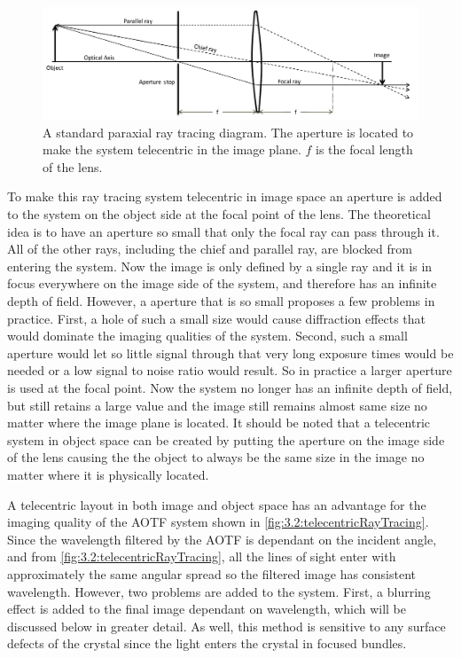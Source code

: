 \begin{figure}[h!]
    \includegraphics[width=1.0\textwidth]{./Images/3-2-RayTracing.pdf}
    \caption[Telecentric Ray Tracing Diagram]{A standard paraxial ray tracing diagram. The aperture is located to make the system telecentric in the image plane. $f$ is the focal length of the lens.}
    \label{fig:3.2:rayTracing}
\end{figure}

To make this ray tracing system telecentric in image space an aperture is added to the system on the object side at the focal point of the lens. The theoretical idea is to have an aperture so small that only the focal ray can pass through it. All of the other rays, including the chief and parallel ray, are blocked from entering the system. Now the image is only defined by a single ray and it is in focus everywhere on the image side of the system, and therefore has an infinite depth of field. However, a aperture that is so small proposes a few problems in practice. First, a hole of such a small size would cause diffraction effects that would dominate the imaging qualities of the system. Second, such a small aperture would let so little signal through that very long exposure times would be needed or a low signal to noise ratio would result. So in practice a larger aperture is used at the focal point. Now the system no longer has an infinite depth of field, but still retains a large value and the image still remains almost same size no matter where the image plane is located. It should be noted that a telecentric system in object space can be created by putting the aperture on the image side of the lens causing the the object to always be the same size in the image no matter where it is physically located.


A telecentric layout in both image and object space has an advantage for the imaging quality of the AOTF system shown in \autoref{fig:3.2:telecentricRayTracing}. Since the wavelength filtered by the AOTF is dependant on the incident angle, and from \autoref{fig:3.2:telecentricRayTracing}, all the lines of sight enter with approximately the same angular spread so the filtered image has consistent wavelength. However, two problems are added to the system. First, a blurring effect is added to the final image dependant on wavelength, which will be discussed below in greater detail. As well, this method is sensitive to any surface defects of the crystal since the light enters the crystal in focused bundles.

